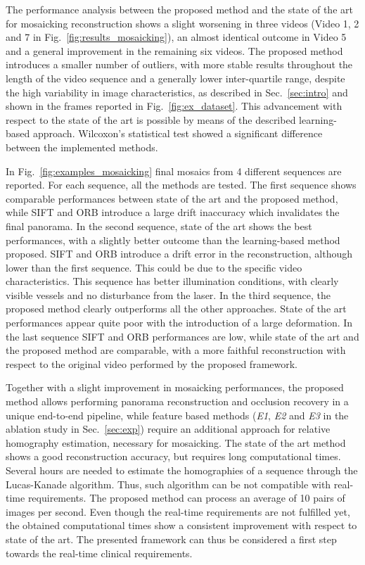 \documentclass[sn-basic]{sn-jnl}%
\begin{document}
The performance analysis between the proposed method and the state of the art for mosaicking reconstruction shows a slight worsening in three videos (Video 1, 2 and 7 in Fig.~\ref{fig:results_mosaicking}), an almost identical outcome in Video 5 and a general improvement in the remaining six videos. The proposed method introduces a smaller number of outliers, with more stable results throughout the length of the video sequence and a generally lower inter-quartile range, despite the high variability in image characteristics, as described in Sec.~\ref{sec:intro} and shown in the frames reported in Fig.~\ref{fig:ex_dataset}. This advancement with respect to the state of the art is possible by means of the described learning-based approach. Wilcoxon's statistical test showed a significant difference between the implemented methods.

In Fig.~\ref{fig:examples_mosaicking} final mosaics from 4 different sequences are reported. For each sequence, all the methods are tested. The first sequence shows comparable performances between state of the art and the proposed method, while SIFT and ORB introduce a large drift inaccuracy which invalidates the final panorama. In the second sequence, state of the art shows the best performances, with a slightly better outcome than the learning-based method proposed. SIFT and ORB introduce a drift error in the reconstruction, although lower than the first sequence. This could be due to the specific video characteristics. This sequence has better illumination conditions, with clearly visible vessels and no disturbance from the laser. In the third sequence, the proposed method clearly outperforms all the other approaches. State of the art performances appear quite poor with the introduction of a large deformation. In the last sequence SIFT and ORB performances are low, while state of the art and the proposed method are comparable, with a more faithful reconstruction with respect to the original video performed by the proposed framework. 

Together with a slight improvement in mosaicking performances, the proposed method allows performing panorama reconstruction and occlusion recovery in a unique end-to-end pipeline, while feature based methods (\textit{E1}, \textit{E2} and \textit{E3} in the ablation study in Sec.~\ref{sec:exp}) require an additional approach for relative homography estimation, necessary for mosaicking. The state of the art method shows a good reconstruction accuracy, but requires long computational times. Several hours are needed to estimate the homographies of a sequence through the Lucas-Kanade algorithm. Thus, such algorithm can be not compatible with real-time requirements. The proposed method can process an average of 10 pairs of images per second. Even though the real-time requirements are not fulfilled yet, the obtained computational times show a consistent improvement with respect to state of the art. The presented framework can thus be considered a first step towards the real-time clinical requirements. 
\end{document}
